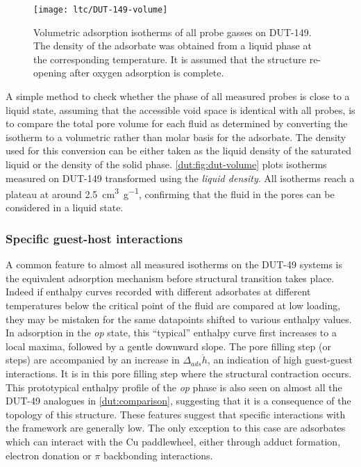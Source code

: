 \begin{figure}[htb]
    \centering
    \texttt{[image: ltc/DUT-149-volume]}%
    \caption{Volumetric adsorption isotherms of all probe gasses
    on DUT-149. The density of the adsorbate was obtained from
    a liquid phase at the corresponding temperature.
    It is assumed that the structure re-opening after oxygen
    adsorption is complete.}%
    \label{dut:fig:dut-volume}
\end{figure}

A simple method to check whether the phase of all measured probes
is close to a liquid state, assuming that the accessible void space 
is identical with all probes, is to compare the total pore volume 
for each fluid as determined by converting the isotherm to a volumetric
rather than molar basis for the adsorbate. The density used for 
this conversion can be either taken as the liquid density of the
saturated liquid or the density of the solid phase.
\autoref{dut:fig:dut-volume} plots isotherms measured on DUT-149
transformed using the \textit{liquid density}. All isotherms reach a plateau
at around \SI{2.5}{\centi\metre^3\per\gram}, confirming that the fluid in 
the pores can be considered in a liquid state.

\subsubsection{Specific guest-host interactions}

A common feature to almost all measured isotherms on the DUT-49 systems
is the equivalent adsorption mechanism before structural transition 
takes place.
Indeed if enthalpy curves recorded with different adsorbates at different
temperatures below the critical point of the fluid are compared at low 
loading, they may be mistaken for the same datapoints shifted to
various enthalpy values.
In adsorption in the \textit{op} state, this ``typical'' enthalpy 
curve first increases to a local maxima, followed
by a gentle downward slope. The pore filling step (or steps)
are accompanied by an increase in \(\Delta_{ads} \dot{h}\),
an indication of high guest-guest interactions. It is in this 
pore filling step where the structural contraction occurs. 
This prototypical enthalpy profile of the \textit{op} phase 
is also seen on almost all the DUT-49 analogues
in \autoref{dut:comparison}, suggesting that it is a consequence of 
the topology of this structure.
These features suggest that specific interactions with the framework
are generally low. The only 
exception to this case are adsorbates which can interact with the 
Cu paddlewheel, either through adduct formation, 
electron donation or \(\pi\) backbonding interactions. 

